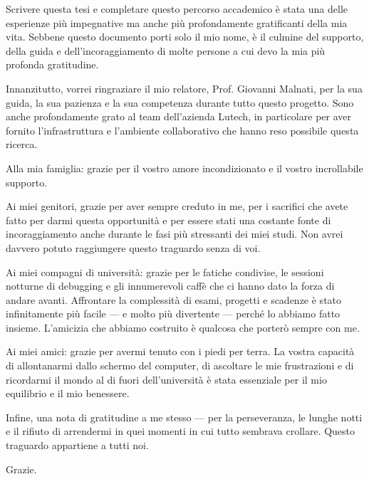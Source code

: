 \begin{itshape} %
Scrivere questa tesi e completare questo percorso accademico è stata una delle esperienze più impegnative ma anche più profondamente gratificanti della mia vita. Sebbene questo documento porti solo il mio nome, è il culmine del supporto, della guida e dell'incoraggiamento di molte persone a cui devo la mia più profonda gratitudine.

\vspace{1em}
Innanzitutto, vorrei ringraziare il mio relatore, Prof. Giovanni Malnati, per la sua guida, la sua pazienza e la sua competenza durante tutto questo progetto. Sono anche profondamente grato al team dell'azienda Lutech, in particolare per aver fornito l'infrastruttura e l'ambiente collaborativo che hanno reso possibile questa ricerca.

\vspace{1em}
Alla mia famiglia: grazie per il vostro amore incondizionato e il vostro incrollabile supporto. 

\vspace{1em}
Ai miei genitori, grazie per aver sempre creduto in me, per i sacrifici che avete fatto per darmi questa opportunità e per essere stati una costante fonte di incoraggiamento anche durante le fasi più stressanti dei miei studi. Non avrei davvero potuto raggiungere questo traguardo senza di voi.

\vspace{1em}
Ai miei compagni di università: grazie per le fatiche condivise, le sessioni notturne di debugging e gli innumerevoli caffè che ci hanno dato la forza di andare avanti. Affrontare la complessità di esami, progetti e scadenze è stato infinitamente più facile --- e molto più divertente --- perché lo abbiamo fatto insieme. L'amicizia che abbiamo costruito è qualcosa che porterò sempre con me.

\vspace{1em}
Ai miei amici: grazie per avermi tenuto con i piedi per terra. La vostra capacità di allontanarmi dallo schermo del computer, di ascoltare le mie frustrazioni e di ricordarmi il mondo al di fuori dell'università è stata essenziale per il mio equilibrio e il mio benessere.

\vspace{1em}
Infine, una nota di gratitudine a me stesso --- per la perseveranza, le lunghe notti e il rifiuto di arrendermi in quei momenti in cui tutto sembrava crollare. Questo traguardo appartiene a tutti noi.

\vspace{1em}
Grazie.
\end{itshape}
